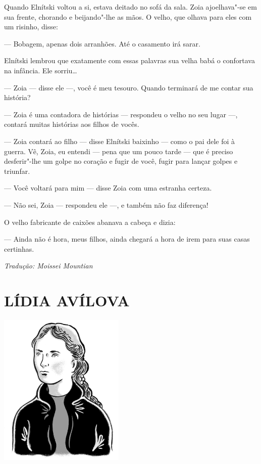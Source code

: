 Quando Elnítski voltou a si, estava deitado no sofá da sala. Zoia
ajoelhava"-se em sua frente, chorando e beijando"-lhe as mãos. O velho,
que olhava para eles com um risinho, disse:

--- Bobagem, apenas dois arranhões. Até o casamento irá sarar.

Elnítski lembrou que exatamente com essas palavras sua velha babá o
confortava na infância. Ele sorriu\ldots{}

--- Zoia --- disse ele ---, você é meu tesouro. Quando terminará de me
contar sua história?

--- Zoia é uma contadora de histórias --- respondeu o velho no seu lugar
---, contará muitas histórias aos filhos de vocês.

--- Zoia contará ao filho --- disse Elnítski baixinho --- como o pai
dele foi à guerra. Vê, Zoia, eu entendi --- pena que um pouco tarde ---
que é preciso desferir"-lhe um golpe no coração e fugir de você, fugir
para lançar golpes e triunfar.

--- Você voltará para mim --- disse Zoia com uma estranha certeza.

--- Não sei, Zoia --- respondeu ele ---, e também não faz diferença!

O velho fabricante de caixões abanava a cabeça e dizia:

--- Ainda não é hora, meus filhos, ainda chegará a hora de irem para
suas casas certinhas.

\medskip

{\footnotesize\hfill\emph{Tradução: Moissei Mountian}}


\part[LÍDIA AVÍLOVA]{LÍDIA AVÍLOVA }

\pagebreak
\thispagestyle{empty}
\mbox{}
\vfill
\begin{center}
\includegraphics[width=6cm]{./imgs/autor8.jpg}
\end{center}

